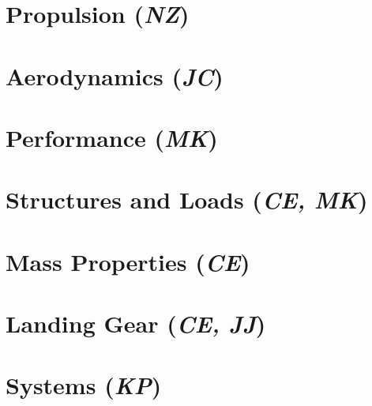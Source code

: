 \documentclass[conf]{new-aiaa}
\begin{document}
\clearpage
\section{Propulsion (\textit{NZ})}
\label{section: Propulsion}


\clearpage
\section{Aerodynamics (\textit{JC})}
\label{section: Aerodynamics}


\section{Performance (\textit{MK})}
\label{section: Performance}


% 

\clearpage
\section{Structures and Loads (\textit{CE, MK})}
\label{section: Structures and Loads}


\clearpage
\section{Mass Properties (\textit{CE})}
\label{section: Mass Properties}


\section{Landing Gear (\textit{CE, JJ})}
\label{section: Landing Gear}


\clearpage
\section{Systems (\textit{KP})}
\label{section: Systems}


% 
\end{document}

